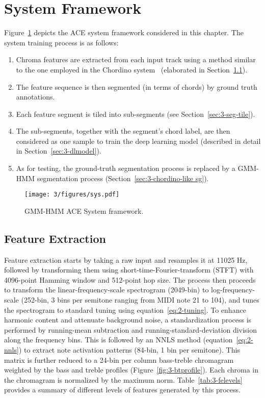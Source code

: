 
\section{System Framework} \label{sec:3-sysframe}

Figure~\ref{fig:3-sysover} depicts the ACE system framework considered in this chapter. The system training process is as follows:
\begin{enumerate}
\item Chroma features are extracted from each input track using a method similar to the one employed in the Chordino system~\cite{mauch2010automatic,cannam2010sonic} (elaborated in Section~\ref{sec:3-chordino-like fe}).
\item The feature sequence is then segmented (in terms of chords) by ground truth annotations.
\item Each feature segment is tiled into sub-segments (see Section~\ref{sec:3-seg-tile}).
\item The sub-segments, together with the segment's chord label, are then considered as one sample to train the deep learning model (described in detail in Section~\ref{sec:3-dlmodel}).
\item As for testing, the ground-truth segmentation process is replaced by a GMM-HMM segmentation process (Section~\ref{sec:3-chordino-like sg}).
\end{enumerate}


\begin{figure}
\centering
\texttt{[image: 3/figures/sys.pdf]}
\caption{GMM-HMM ACE System framework.}
\label{fig:3-sysover}
\end{figure}

\subsection{Feature Extraction} \label{sec:3-chordino-like fe}
Feature extraction starts by taking a raw input and resamples it at 11025 Hz, followed by transforming them using short-time-Fourier-transform (STFT) with 4096-point Hamming window and 512-point hop size. The process then proceeds to transform the linear-frequency-scale spectrogram (2049-bin) to log-frequency-scale (252-bin, 3 bins per semitone ranging from MIDI note 21 to 104), and tunes the spectrogram to standard tuning using equation~\ref{eq:2-tuning}. To enhance harmonic content and attenuate background noise, a standardization process is performed by running-mean subtraction and running-standard-deviation division along the frequency bins. This is followed by an NNLS method \cite{mauch2010approximate} (equation~\ref{eq:2-nnls}) to extract note activation patterns (84-bin, 1 bin per semitone). This matrix is further reduced to a 24-bin per column bass-treble chromagram weighted by the bass and treble profiles (Figure~\ref{fig:3-btprofile}). Each chroma in the chromagram is normalized by the maximum norm. Table~\ref{tab:3-felevels} provides a summary of different levels of features generated by this process.


